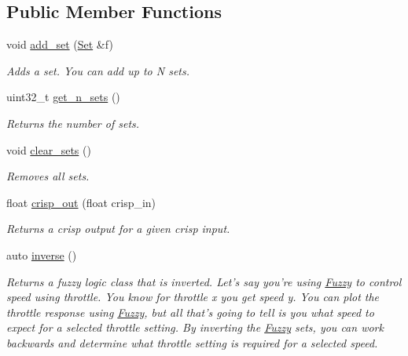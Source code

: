 \subsection*{Public Member Functions}
\begin{DoxyCompactItemize}
\item 
void \hyperlink{classetk_1_1_fuzzy_abe817aa98e6ad63a9d0f9d28aa917d7a}{add\-\_\-set} (\hyperlink{classetk_1_1_fuzzy_1_1_set}{Set} \&f)
\begin{DoxyCompactList}\small\item\em Adds a set. You can add up to N sets. \end{DoxyCompactList}\item 
uint32\-\_\-t \hyperlink{classetk_1_1_fuzzy_a4f3805dacad88776a8167552af8d9066}{get\-\_\-n\-\_\-sets} ()
\begin{DoxyCompactList}\small\item\em Returns the number of sets. \end{DoxyCompactList}\item 
void \hyperlink{classetk_1_1_fuzzy_a000d2dcf15ab0aa1d6cb9b7a528c2ed4}{clear\-\_\-sets} ()
\begin{DoxyCompactList}\small\item\em Removes all sets. \end{DoxyCompactList}\item 
float \hyperlink{classetk_1_1_fuzzy_a87b7d8737b59a22c8059c1a4bdc272bd}{crisp\-\_\-out} (float crisp\-\_\-in)
\begin{DoxyCompactList}\small\item\em Returns a crisp output for a given crisp input. \end{DoxyCompactList}\item 
auto \hyperlink{classetk_1_1_fuzzy_a4a4952392e6950a71734304a8b880fab}{inverse} ()
\begin{DoxyCompactList}\small\item\em Returns a fuzzy logic class that is inverted. Let's say you're using \hyperlink{classetk_1_1_fuzzy}{Fuzzy} to control speed using throttle. You know for throttle x you get speed y. You can plot the throttle response using \hyperlink{classetk_1_1_fuzzy}{Fuzzy}, but all that's going to tell is you what speed to expect for a selected throttle setting. By inverting the \hyperlink{classetk_1_1_fuzzy}{Fuzzy} sets, you can work backwards and determine what throttle setting is required for a selected speed. \end{DoxyCompactList}\end{DoxyCompactItemize}


